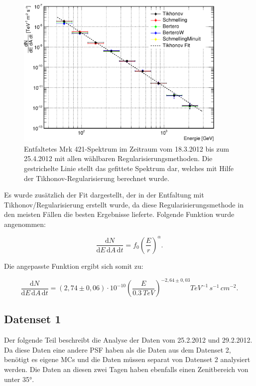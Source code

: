 \begin{figure}
    \centering
    \includegraphics[width=0.9\textwidth]{./Plots/04_MrkAnalyse/Datenset2/Spektrum_Mrk421.pdf}
    \caption{Entfaltetes Mrk 421-Spektrum im Zeitraum vom 18.3.2012 bis zum 25.4.2012 mit allen wählbaren Regularisierungsmethoden.
    Die gestrichelte Linie stellt das gefittete Spektrum dar, welches mit Hilfe der Tikhonov-Regularisierung berechnet wurde.}
    \label{Datenset2_CombunFold_Mrk421}
\end{figure}

Es wurde zusätzlich der Fit dargestellt, der in der Entfaltung mit Tikhonov\-/Regularisierung erstellt wurde, da diese Regularisierungsmethode in den meisten Fällen die besten Ergebnisse lieferte.
Folgende Funktion wurde angenommen:

\begin{equation}
 \frac{\mathrm{d}N}{\mathrm{d}E\,\mathrm{d}A\,\mathrm{d}t}=f_0\left( \frac{E}{r} \right)^\alpha.
\end{equation}

Die angepasste Funktion ergibt sich somit zu:

\begin{equation}
 \frac{\mathrm{d}N}{\mathrm{d}E\,\mathrm{d}A\,\mathrm{d}t}=(2,74 \pm 0,06) \cdot 10^{-10}\left( \frac{E}{\SI{0,3}{TeV}} \right)^{-2,64 \pm 0,03} \si{TeV^{-1}\,s^{-1}\,cm^{-2}}.
\end{equation}


\FloatBarrier

\subsection{Datenset 1}
\label{subsec:Datenset_1}
Der folgende Teil beschreibt die Analyse der Daten vom 25.2.2012 und 29.2.2012.
Da diese Daten eine andere PSF haben als die Daten aus dem Datenset 2, benötigt es eigene MCs und die Daten müssen separat von Datenset 2 analysiert werden.
Die Daten an diesen zwei Tagen haben ebenfalls einen Zenitbereich von unter 35°.

